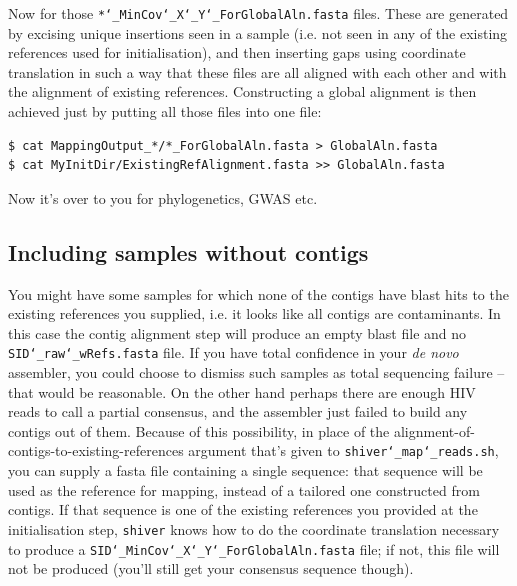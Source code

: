 \documentclass{article}
\newcommand{\shiv}{\texttt{shiver}\xspace}
\let\c\texttt
\begin{document}
Now for those \c{*\char`_MinCov\char`_X\char`_Y\char`_ForGlobalAln.fasta} files.
These are generated by excising unique insertions seen in a sample (i.e. not seen in any of the existing references used for initialisation), and then inserting gaps using coordinate translation in such a way that these files are all aligned with each other and with the alignment of existing references.
Constructing a global alignment is then achieved just by putting all those files into one file:
\begin{Verbatim}[samepage=true]
$ cat MappingOutput_*/*_ForGlobalAln.fasta > GlobalAln.fasta
$ cat MyInitDir/ExistingRefAlignment.fasta >> GlobalAln.fasta
\end{Verbatim}
Now it's over to you for phylogenetics, GWAS etc.

\subsection*{Including samples without contigs}
You might have some samples for which none of the contigs have blast hits to the existing references you supplied, i.e. it looks like all contigs are contaminants.
In this case the contig alignment step will produce an empty blast file and no \c{SID\char`_raw\char`_wRefs.fasta} file.
If you have total confidence in your {\it de novo} assembler, you could choose to dismiss such samples as total sequencing failure -- that would be reasonable.
On the other hand perhaps there are enough HIV reads to call a partial consensus, and the assembler just failed to build any contigs out of them.
Because of this possibility, in place of the alignment-of-contigs-to-existing-references argument that's given to \c{shiver\char`_map\char`_reads.sh}, you can supply a fasta file containing a single sequence: that sequence will be used as the reference for mapping, instead of a tailored one constructed from contigs.
If that sequence is one of the existing references you provided at the initialisation step, \shiv knows how to do the coordinate translation necessary to produce a \c{SID\char`_MinCov\char`_X\char`_Y\char`_ForGlobalAln.fasta} file; if not, this file will not be produced (you'll still get your consensus sequence though).
\end{document}
